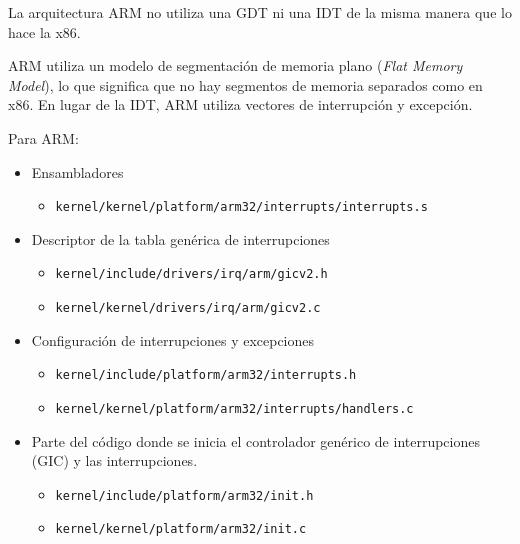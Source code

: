 		La arquitectura ARM no utiliza una GDT ni una IDT de la misma manera que lo hace la x86.
		
		
		ARM utiliza un modelo de segmentación de memoria plano (\textit{Flat Memory Model}), lo que significa que no hay segmentos de memoria separados como en x86. En lugar de la IDT, ARM utiliza vectores de interrupción y excepción.
		
		
	
		Para ARM:
		\begin{itemize} \setlength\itemsep{0pt}
			\item Ensambladores
			\begin{itemize} \setlength\itemsep{0pt}
				\item \texttt{kernel/kernel/platform/arm32/interrupts/interrupts.s}
			\end{itemize}
		
			\item Descriptor de la tabla genérica de interrupciones
			\begin{itemize} \setlength\itemsep{0pt}
				\item \texttt{kernel/include/drivers/irq/arm/gicv2.h}
				\item \texttt{kernel/kernel/drivers/irq/arm/gicv2.c}
			\end{itemize}
		
			\item Configuración de interrupciones y excepciones
			\begin{itemize} \setlength\itemsep{0pt}
				\item \texttt{kernel/include/platform/arm32/interrupts.h}
				\item \texttt{kernel/kernel/platform/arm32/interrupts/handlers.c}
			\end{itemize}
		
			\item Parte del código donde se inicia el controlador genérico de interrupciones (GIC) y las interrupciones.
			\begin{itemize} \setlength\itemsep{0pt}
				\item \texttt{kernel/include/platform/arm32/init.h}
				\item \texttt{kernel/kernel/platform/arm32/init.c}
			\end{itemize}	
		\end{itemize}
	
